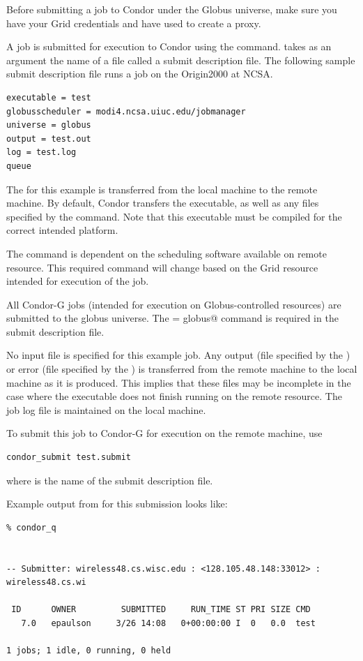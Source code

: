 
Before submitting a job to Condor under the Globus universe,
make sure you have your Grid 
credentials and have used  to create a proxy.

A job is submitted for execution to Condor using the
 command.
 takes as an argument
the name of a file called a submit description file.
The following sample submit description file runs a job on
the Origin2000 at NCSA.

\begin{verbatim}
executable = test
globusscheduler = modi4.ncsa.uiuc.edu/jobmanager
universe = globus
output = test.out
log = test.log
queue
\end{verbatim} 

The 
for this example is
transferred from the local machine to the remote machine.
By default, Condor transfers the executable, as well as any
files specified by the  command.
Note that this executable must be compiled for the correct
intended platform.

The  command is dependent on the
scheduling software available on remote resource.
This required command will change based on the Grid resource
intended for execution of the job.

All Condor-G jobs (intended for execution on Globus-controlled
resources) are submitted to the globus universe.
The \verb@universe = globus@ command is required
in the submit description file.

No input file is specified for this example job.
Any output (file specified by the )
or error (file specified by the )
is transferred 
from the remote machine to the local machine as it is produced.
This implies that these files may be incomplete in the case
where the executable does not finish running on the remote resource.
The job log file is maintained on the local machine.

To submit this job to Condor-G for execution on the
remote machine, use
\begin{verbatim}
condor_submit test.submit
\end{verbatim}
where  is the name of the submit description file.

Example output from 
 for this submission looks like:
\footnotesize
\begin{verbatim}
% condor_q


-- Submitter: wireless48.cs.wisc.edu : <128.105.48.148:33012> : wireless48.cs.wi

 ID      OWNER         SUBMITTED     RUN_TIME ST PRI SIZE CMD
   7.0   epaulson     3/26 14:08   0+00:00:00 I  0   0.0  test

1 jobs; 1 idle, 0 running, 0 held
\end{verbatim}
\normalsize

